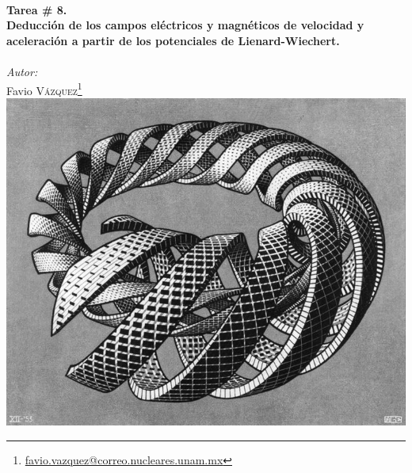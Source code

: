\documentclass[a4paper,11pt]{article}
\numberwithin{equation}{section}
\begin{document}
\begin{titlepage}

\HRule \\[0.1cm]
{ \huge \bfseries Tarea \# 8. \\ Deducción de los campos eléctricos y magnéticos de velocidad y 
aceleración a partir de los potenciales de Lienard-Wiechert.}\\ %
\HRule \\[0.1cm]
 
\setcounter{footnote}{0}
\center
\large
\emph{Autor:} \\ %
\Large Favio \textsc{Vázquez}\footnote[1]{\href{mailto:favio.vazquez@correo.nucleares.unam.mx}{favio.vazquez@correo.nucleares.unam.mx}}
\\[0.7cm]

\includegraphics[scale=0.55]{escherEspiral}


\vfill %

\end{titlepage}
\end{document}
